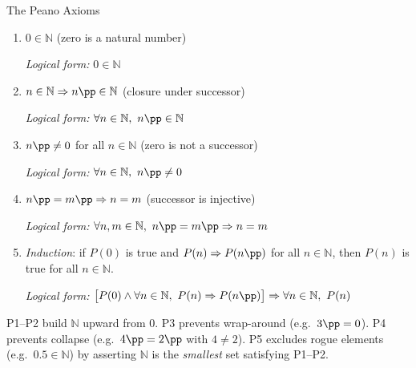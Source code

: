 
\begin{propositionbox}{The Peano Axioms}
\begin{enumerate}
  \item[\textbf{P1.}] $0 \in \mathbb{N}$ \quad (zero is a natural number)

    \textit{Logical form:} $0 \in \mathbb{N}$

  \item[\textbf{P2.}] $n \in \mathbb{N} \Rightarrow n\pp \in \mathbb{N}$
    \quad (closure under successor)

    \textit{Logical form:} $\forall n \in \mathbb{N},\ n\pp \in \mathbb{N}$

  \item[\textbf{P3.}] $n\pp \neq 0$ for all $n \in \mathbb{N}$
    \quad (zero is not a successor)

    \textit{Logical form:} $\forall n \in \mathbb{N},\ n\pp \neq 0$

  \item[\textbf{P4.}] $n\pp = m\pp \Rightarrow n = m$
    \quad (successor is injective)

    \textit{Logical form:} $\forall n, m \in \mathbb{N},\ n\pp = m\pp \Rightarrow n = m$

  \item[\textbf{P5.}] \emph{Induction}: if $P(0)$ is true and
    $P(n) \Rightarrow P(n\pp)$ for all $n \in \mathbb{N}$,
    then $P(n)$ is true for all $n \in \mathbb{N}$.

    \textit{Logical form:}
    $\bigl[P(0) \wedge \forall n \in \mathbb{N},\ P(n) \Rightarrow P(n\pp)\bigr]
    \Rightarrow \forall n \in \mathbb{N},\ P(n)$
\end{enumerate}
\end{propositionbox}










\begin{remark}
P1--P2 build $\mathbb{N}$ upward from $0$.
P3 prevents wrap-around (e.g.\ $3\pp = 0$).
P4 prevents collapse (e.g.\ $4\pp = 2\pp$ with $4 \neq 2$).
P5 excludes rogue elements (e.g.\ $0.5 \in \mathbb{N}$) by
asserting $\mathbb{N}$ is the \emph{smallest} set satisfying P1--P2.
\end{remark}

